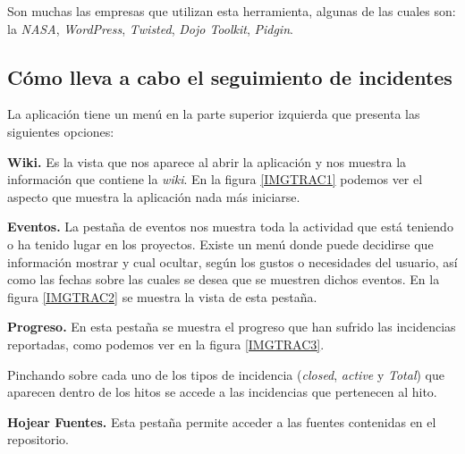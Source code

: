 \documentclass[11pt,a4paper,spanish,twoside]{report}
\begin{document}
        Son muchas las empresas que utilizan esta herramienta, algunas de las
        cuales son: la \emph{NASA}, \emph{WordPress}, \emph{Twisted},
        \emph{Dojo Toolkit}, \emph{Pidgin}. 

	\subsection{Cómo lleva a cabo el seguimiento de incidentes}

        La aplicación tiene un menú en la parte superior izquierda que
        presenta las siguientes opciones:
        \begin{description}
          \item \textbf{Wiki.} Es la vista que nos aparece al abrir
            la aplicación y nos muestra la información que contiene la
            \emph{wiki}. En la figura \ref{IMGTRAC1} podemos ver el aspecto
            que muestra la aplicación nada más iniciarse.


          \item \textbf{Eventos.} La pestaña de eventos nos muestra toda la
            actividad que está teniendo o ha tenido lugar en los
            proyectos. Existe un menú donde puede decidirse que información
            mostrar y cual ocultar, según los gustos o necesidades del
            usuario, así como las fechas sobre las cuales se desea que se
            muestren dichos eventos. En la figura \ref{IMGTRAC2} se muestra la
            vista de esta pestaña.


          \item \textbf{Progreso.} En esta pestaña se muestra el progreso que
            han sufrido las incidencias reportadas, como podemos ver en la
            figura \ref{IMGTRAC3}. 

            
            Pinchando sobre cada uno de los tipos de incidencia
            (\emph{closed}, \emph{active} y \emph{Total}) que aparecen dentro
            de los hitos se accede a las incidencias que pertenecen al hito.

          \item \textbf{Hojear Fuentes.} Esta pestaña permite acceder a las
            fuentes contenidas en el repositorio.


\end{description}
\end{document}
